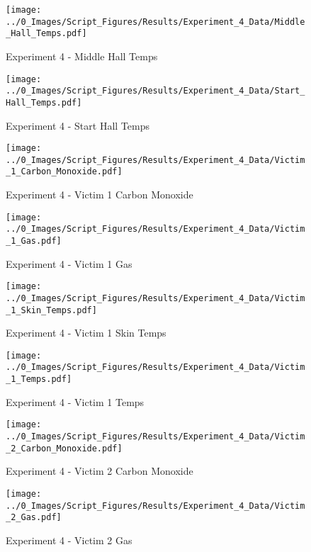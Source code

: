 	\clearpage

	\begin{figure}[H]
		\centering
		\texttt{[image: ../0\_Images/Script\_Figures/Results/Experiment\_4\_Data/Middle\_Hall\_Temps.pdf]}
		\caption[]{Experiment 4 - Middle Hall Temps}
	\end{figure}
 

	\begin{figure}[H]
		\centering
		\texttt{[image: ../0\_Images/Script\_Figures/Results/Experiment\_4\_Data/Start\_Hall\_Temps.pdf]}
		\caption[]{Experiment 4 - Start Hall Temps}
	\end{figure}
 
	\clearpage

	\begin{figure}[H]
		\centering
		\texttt{[image: ../0\_Images/Script\_Figures/Results/Experiment\_4\_Data/Victim\_1\_Carbon\_Monoxide.pdf]}
		\caption[]{Experiment 4 - Victim 1 Carbon Monoxide}
	\end{figure}
 

	\begin{figure}[H]
		\centering
		\texttt{[image: ../0\_Images/Script\_Figures/Results/Experiment\_4\_Data/Victim\_1\_Gas.pdf]}
		\caption[]{Experiment 4 - Victim 1 Gas}
	\end{figure}
 
	\clearpage

	\begin{figure}[H]
		\centering
		\texttt{[image: ../0\_Images/Script\_Figures/Results/Experiment\_4\_Data/Victim\_1\_Skin\_Temps.pdf]}
		\caption[]{Experiment 4 - Victim 1 Skin Temps}
	\end{figure}
 

	\begin{figure}[H]
		\centering
		\texttt{[image: ../0\_Images/Script\_Figures/Results/Experiment\_4\_Data/Victim\_1\_Temps.pdf]}
		\caption[]{Experiment 4 - Victim 1 Temps}
	\end{figure}
 
	\clearpage

	\begin{figure}[H]
		\centering
		\texttt{[image: ../0\_Images/Script\_Figures/Results/Experiment\_4\_Data/Victim\_2\_Carbon\_Monoxide.pdf]}
		\caption[]{Experiment 4 - Victim 2 Carbon Monoxide}
	\end{figure}
 

	\begin{figure}[H]
		\centering
		\texttt{[image: ../0\_Images/Script\_Figures/Results/Experiment\_4\_Data/Victim\_2\_Gas.pdf]}
		\caption[]{Experiment 4 - Victim 2 Gas}
	\end{figure}
 
